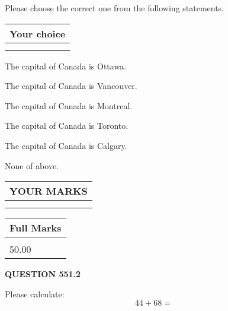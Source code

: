\documentclass[12pt]{article}
\begin{document}
  
Please choose the correct one from the following statements.
  
  
\noindent\hspace{3.0in} \begin{tabular}{|l|}
\hline
Your choice \\
\hline
 \\ 
 \\ 
\hline
\end{tabular}
  
  
 
 
The capital of Canada is Ottawa.
 
 
The capital of Canada is Vancouver.
 
 
The capital of Canada is Montreal.
 
 
The capital of Canada is Toronto.
 
 
The capital of Canada is Calgary.
 
 
 None of above.
 
 
  
\vspace{0.2in}
  
\noindent\begin{tabular}{|l|}
\hline
 YOUR MARKS  \\
\hline
 \\ 
 \\ 
\hline
\end{tabular}
\hspace{0.05in} \begin{tabular}{|l|}
\hline
 Full Marks  \\
\hline
 \\ 
50.00 \\
\hline
\end{tabular}
{\textbf{\Large{QUESTION
551.2 
}}}
  
  
 
Please calculate:
\begin{equation}
44 +  %
68 = \nonumber
\end{equation}
 

 

 
   
   
 \vspace{0.2in}
 
   
   
   
   
\end{document}
